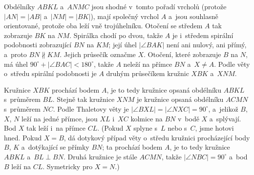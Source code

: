 %
{
    Obdélníky $ABKL$ a~$ANMC$ jsou shodné v~tomto pořadí vrcholů (protože $|AN| = |AB|$ a~$|NM| = |BK|$), mají společný vrchol $A$ a~jsou souhlasně orientované, protože oba leží vně trojúhelníku. Otočení se středem $A$ tak zobrazuje $BK$ na $NM$. Spirálka chodí po dvou, takže $A$ je i~středem spirální podobnosti zobrazující $BN$ na $KM$; její úhel $|\angle BAK|$ není ani nulový, ani přímý, a~proto $BN \nparallel KM$. Jejich průsečík označme $X$. Otočení, které zobrazuje $B$ na $N$, má úhel $90^\circ + |\angle BAC| < 180^\circ$, takže $A$ neleží na přímce $BN$ a~$X \neq A$. Podle věty o~středu spirální podobnosti je $A$ druhým průsečíkem kružnic $XBK$ a~$XNM$.


    Kružnice $XBK$ prochází bodem $A$, je to tedy kružnice opsaná obdélníku $ABKL$ s~průměrem $BL$. Stejně tak kružnice $XNM$ je kružnice opsaná obdélníku $ACMN$ s~průměrem $NC$. Podle Thaletovy věty je $|\angle BXL| = |\angle NXC| = 90^\circ$, a~jelikož $B$, $X$, $N$ leží na jedné přímce, jsou $XL$ i~$XC$ kolmice na $BN$ v~bodě $X$ a~splývají. Bod $X$ tak leží i~na přímce $CL$. (Pokud $X$ splyne s~$L$ nebo s~$C$, jsme hotovi hned. Pokud $X = B$, dá dotykový případ věty o~středu kružnici procházející body $B$, $K$ a~dotýkající se přímky $BN$; ta prochází bodem $A$, je to tedy kružnice $ABKL$ a~$BL \perp BN$. Druhá kružnice je stále $ACMN$, takže $|\angle NBC| = 90^\circ$ a~bod $B$ leží na $CL$. Symetricky pro $X = N$.)
}

